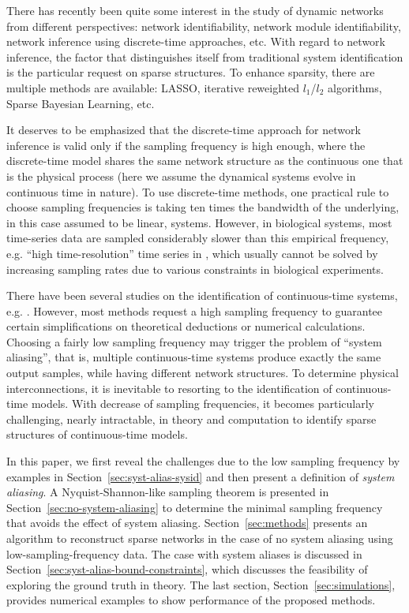 \documentclass[letterpaper,10pt,journal,final]{IEEEtran}
\theoremstyle{definition}
\theoremstyle{remark}
\begin{document}
There has recently been quite some interest in the study of dynamic networks
from different perspectives: network
identifiability\cite{Goncalves2008,Hayden2016a}, network module
identifiability\cite{VandenHof2013}, network inference using discrete-time
approaches\cite{Chiuso2012,Yue2017a}, etc. With regard to network inference, the
factor that distinguishes itself from traditional system
identification\cite{Ljung1998} is the particular request on sparse
structures. To enhance sparsity, there are multiple methods are available:
LASSO\cite{Yuan2006}, iterative reweighted $l_1$/$l_2$
algorithms\cite{Candes2008,Chartrand2008}, Sparse Bayesian
Learning\cite{Tipping2001,Wipf2007}, etc.


It deserves to be emphasized that the discrete-time approach for network
inference is valid only if the sampling frequency is high enough, where the
discrete-time model shares the same network structure as the continuous one that
is the physical process (here we assume the dynamical systems evolve in
continuous time in nature).  To use discrete-time methods, one practical rule to
choose sampling frequencies is taking ten times the bandwidth of the underlying,
in this case assumed to be linear, systems\cite{Ljung1998}.  However, in
biological systems, most time-series data are sampled considerably slower than
this empirical frequency, e.g. ``high time-resolution'' time series in
\cite{He2012}, which usually cannot be solved by increasing sampling rates due to
various constraints in biological experiments.

There have been several studies on the identification of continuous-time
systems, e.g. \cite{Ljung2010,Garnier2003}. However, most methods request a high
sampling frequency to guarantee certain simplifications on theoretical
deductions or numerical calculations. Choosing a fairly low sampling frequency
may trigger the problem of ``system aliasing'', that is, multiple
continuous-time systems produce exactly the same output samples, while having
different network structures. To determine physical interconnections, it is
inevitable to resorting to the identification of continuous-time models.  With decrease of sampling frequencies, it becomes particularly
challenging, nearly intractable, in theory and computation to identify sparse
structures of continuous-time models.

In this paper, we first reveal the challenges due to the low sampling frequency
by examples in Section~\ref{sec:syst-alias-sysid} and then present a definition
of \emph{system aliasing}. A Nyquist-Shannon-like sampling theorem is presented
in Section~\ref{sec:no-system-aliasing} to determine the minimal sampling
frequency that avoids the effect of system aliasing.  Section~\ref{sec:methods}
presents an algorithm to reconstruct sparse networks in the case of no system
aliasing using low-sampling-frequency data. The case with system aliases is
discussed in Section~\ref{sec:syst-alias-bound-constraints}, which discusses the
feasibility of exploring the ground truth in theory. The last section,
Section~\ref{sec:simulations}, provides numerical examples to show performance
of the proposed methods.
\end{document}
